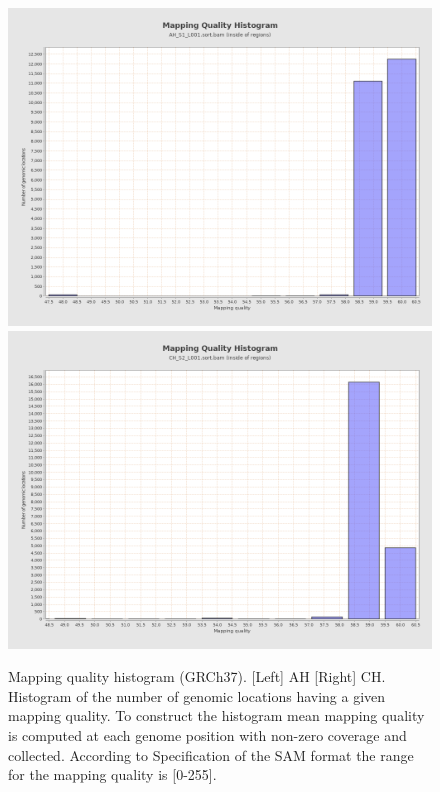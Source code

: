 \documentclass{article}
\begin{document}
\begin{figure}[ht] \hspace*{0cm} 
\begin{center}
    \includegraphics[scale=0.15]{qualimap/AH_S1_L001.sort_stats/images_qualimapReport/genome_mapping_quality_histogram}
        \includegraphics[scale=0.15]{qualimap/CH_S2_L001.sort_stats/images_qualimapReport/genome_mapping_quality_histogram}
	\caption{
	Mapping quality histogram (GRCh37). [Left] AH [Right] CH.
Histogram of the number of genomic locations having a given mapping quality. To construct the histogram mean mapping quality is computed at each genome position with non-zero coverage and collected. According to Specification of the SAM format the range for the mapping quality is [0-255].
	}
	\label{fig:qualimap_map_qual_hist}
\end{center}
\end{figure}
\end{document}
